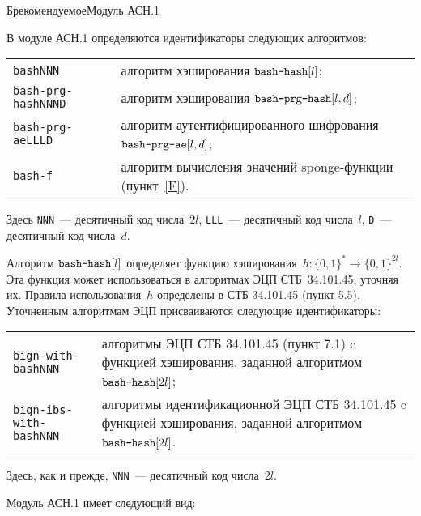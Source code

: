 \begin{appendix}{Б}{рекомендуемое}{Модуль АСН.1}
\label{ASN}

\mbox{}

В модуле АСН.1 определяются идентификаторы следующих алгоритмов:
\begin{center}
\begin{tabular}{p{3.6cm}p{12.7cm}}
\texttt{bashNNN} &
алгоритм хэширования $\texttt{bash-hash}[l]$;\\
%
\texttt{bash-prg-hashNNND} &
алгоритм хэширования $\texttt{bash-prg-hash}[l,d]$;\\
%
\texttt{bash-prg-aeLLLD} &
алгоритм аутентифицированного шифрования $\texttt{bash-prg-ae}[l,d]$;\\
%
\texttt{bash-f}  &
алгоритм вычисления значений sponge-функции (пункт~\ref{F}).\\
\end{tabular}
\end{center}

Здесь \texttt{NNN}~--- десятичный код числа~$2l$, 
\texttt{LLL}~--- десятичный код числа~$l$, 
\texttt{D}~--- десятичный код числа~$d$.

Алгоритм $\texttt{bash-hash}[l]$ определяет функцию 
хэширования~$h\colon \{0,1\}^*\to\{0,1\}^{2l}$. 
Эта функция может использоваться в алгоритмах 
ЭЦП СТБ~34.101.45, уточняя их.
%
Правила использования~$h$ определены в СТБ 34.101.45 (пункт 5.5).
%
Уточненным алгоритмам ЭЦП присваиваются следующие идентификаторы:
\begin{center}
\begin{tabular}{p{4.4cm}p{11.6cm}}
\texttt{bign-with-bashNNN} &
алгоритмы ЭЦП СТБ 34.101.45 (пункт 7.1)
c функцией хэширования, заданной алгоритмом~$\texttt{bash-hash}[2l]$;\\
%
\texttt{bign-ibs-with-bashNNN} &
алгоритмы идентификационной ЭЦП СТБ 34.101.45
c функцией хэширования, заданной алгоритмом~$\texttt{bash-hash}[2l]$.\\
\end{tabular}
\end{center}

Здесь, как и прежде, \texttt{NNN}~--- десятичный код числа~$2l$.

Модуль АСН.1 имеет следующий вид:



\end{appendix}
